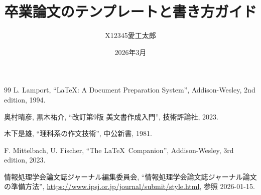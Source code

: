 \documentclass[a4paper,dvipdfmx,openany,uplatex,report]{jsbook} %
\title{卒業論文のテンプレートと書き方ガイド}          %
\subtitle{}                                       %
\author{X12345\quad 愛工太郎}                       %
\affiliation{愛知工業大学\quad 情報科学部\quad 情報科学科} %
\date{2026年3月}                                   %
\begin{document}
    \ThisIsDraft %

    \frontmatter
    \maketitle
    \tableofcontents
    \listoffigures

    \mainmatter
    
    
    
    
    

    \backmatter
    \begin{thebibliography}{99}
        L. Lamport, ``\LaTeX: A Document Preparation System'', Addison-Wesley, 2nd edition, 1994.

        奥村晴彦, 黒木祐介, ``改訂第9版 \LaTeXe 美文書作成入門'', 技術評論社, 2023.

        木下是雄, ``理科系の作文技術'', 中公新書, 1981.

        F. Mittelbach, U. Fischer, ``The \LaTeX\ Companion'', Addison-Wesley, 3rd edition, 2023.

        情報処理学会論文誌ジャーナル編集委員会, ``情報処理学会論文誌ジャーナル論文の準備方法'', \url{https://www.ipsj.or.jp/journal/submit/style.html}, 参照 2026-01-15.
    \end{thebibliography}
\end{document}
